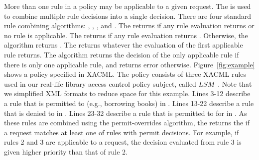 More than one rule in a policy may be applicable to a given request.
The  is used to combine multiple
rule decisions into a single decision. There are four standard rule
combining algorithms: , , , and . The
 returns  if any rule
evaluation returns  or no rule is applicable. The
 returns  if any
rule evaluation returns . Otherwise, the algorithm
returns .
The  returns whatever the
evaluation of the first applicable rule returns. The
 algorithm returns the decision of the only
applicable rule if there is only one applicable rule, and returns
error otherwise.
Figure~\ref{fig:example} shows a policy specified
in XACML. The policy consists of three XACML rules used in our real-life library access
control policy subject, called $LSM$~\cite{mouelhi09:tranforming}.
Note that we simplified XML formats to reduce
space for this example.
Lines 3-12 describe a rule that  is permitted to  (e.g., borrowing books)  in .
Lines 13-22 describe a rule that  is denied to   in .
Lines 23-32 describe a rule that  is permitted to  for  in .
As these rules are combined using the permit-overrides algorithm, the  returns the  if
 a request matches at least one of rules with permit decisions. For example, if rules 2 and 3 are applicable to a request, the decision
evaluated from rule 3 is given higher priority than that of rule 2.


